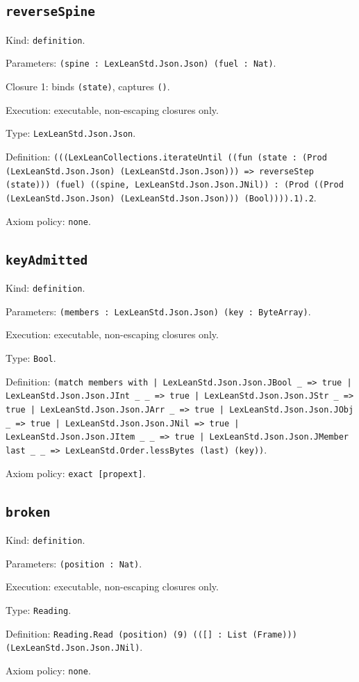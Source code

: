 \documentclass[11pt]{article}
\begin{document}
\subsection*{\texttt{reverseSpine}}
\noindent Kind: \texttt{definition}.\par
\noindent Parameters: \texttt{(spine : LexLeanStd.Json.Json) (fuel : Nat)}.\par
\noindent Closure 1: binds \texttt{(state)}, captures \texttt{()}.\par
\noindent Execution: executable, non-escaping closures only.\par
\noindent Type: \texttt{LexLeanStd.Json.Json}.\par
\noindent Definition: \texttt{(((LexLeanCollections.iterateUntil ((fun (state : (Prod (LexLeanStd.Json.Json) (LexLeanStd.Json.Json))) => reverseStep (state))) (fuel) ((spine, LexLeanStd.Json.Json.JNil)) : (Prod ((Prod (LexLeanStd.Json.Json) (LexLeanStd.Json.Json))) (Bool)))).1).2}.\par
\noindent Axiom policy: \texttt{none}.\par
\subsection*{\texttt{keyAdmitted}}
\noindent Kind: \texttt{definition}.\par
\noindent Parameters: \texttt{(members : LexLeanStd.Json.Json) (key : ByteArray)}.\par
\noindent Execution: executable, non-escaping closures only.\par
\noindent Type: \texttt{Bool}.\par
\noindent Definition: \texttt{(match members with | LexLeanStd.Json.Json.JBool \_ => true | LexLeanStd.Json.Json.JInt \_ \_ => true | LexLeanStd.Json.Json.JStr \_ => true | LexLeanStd.Json.Json.JArr \_ => true | LexLeanStd.Json.Json.JObj \_ => true | LexLeanStd.Json.Json.JNil => true | LexLeanStd.Json.Json.JItem \_ \_ => true | LexLeanStd.Json.Json.JMember last \_ \_ => LexLeanStd.Order.lessBytes (last) (key))}.\par
\noindent Axiom policy: \texttt{exact [propext]}.\par
\subsection*{\texttt{broken}}
\noindent Kind: \texttt{definition}.\par
\noindent Parameters: \texttt{(position : Nat)}.\par
\noindent Execution: executable, non-escaping closures only.\par
\noindent Type: \texttt{Reading}.\par
\noindent Definition: \texttt{Reading.Read (position) (9) (([] : List (Frame))) (LexLeanStd.Json.Json.JNil)}.\par
\noindent Axiom policy: \texttt{none}.\par
\end{document}
